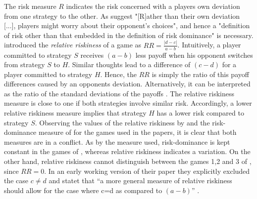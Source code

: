 The risk measure $R$ indicates the risk concerned with a players own
deviation from one strategy to the other. 
As \textcite[19]{rydval_loss_2005} suggest "[R]ather than their
own deviation [...], players might worry about their opponent's choices", 
and hence a "definition of risk other than that embedded in the definition
of risk dominance" is necessary.
\textcite[371]{dubois_optimization_2012} 
introduced the \textit{relative riskiness} of a game as
$RR = \frac{|d-c|}{a-b}$.
Intuitively, a player committed to strategy $S$ receives $(a-b)$ less payoff 
when his opponent switches from strategy $S$ to $H$. Similar thoughts lead
to a difference of $(c-d)$ for a player committed to strategy $H$. Hence, the
$RR$ is simply the ratio of this payoff differences caused by an opponents
deviation.
Alternatively, it can be interpreted as the ratio of the 
standard deviations of the payoffs 
\parencite[372]{dubois_optimization_2012}. 
The relative riskiness measure is close to one if both strategies involve
similar risk. Accordingly, a lower relative riskiness measure implies that
strategy $H$ has a lower risk compared to strategy $S$.
Observing the values of the relative riskiness by 
\textcite{dubois_optimization_2012} and the risk-dominance measure of 
\textcite{schmidt_playing_2003} for the games used in the papers, it is clear
that both measures are in a conflict. As by the measure 
\textcite{schmidt_playing_2003} used, risk-dominance is kept 
constant in the games of  \textcite{battalio_optimization_2001}, 
whereas relative riskiness indicates a variation. 
On the other hand, relative riskiness cannot distinguish between
the games 1,2 and 3 of \textcite{schmidt_playing_2003}, since $RR=0$. In an
early working version of their paper they explicitly excluded the case 
$c \neq d$ and statet that ``a more general measure of relative riskiness 
should allow for the case where c=d as compared to $(a-b)$'' 
\parencite{dubois_optimization_2008}. 

